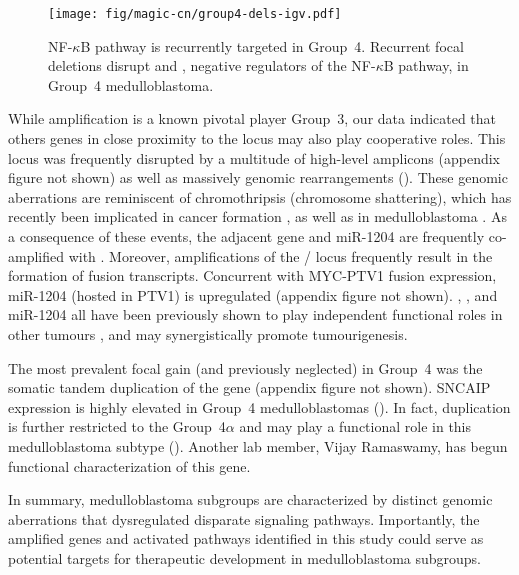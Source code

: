 \begin{SCfigure}[2]
	\centering
	\texttt{[image: fig/magic-cn/group4-dels-igv.pdf]}
	\caption[NF-$\kappa$B pathway is recurrently targeted in Group~4]
	{
	NF-$\kappa$B pathway is recurrently targeted in Group~4.
	Recurrent focal deletions disrupt  and , negative regulators of the NF-$\kappa$B pathway, in Group~4 medulloblastoma.
	}
	\label{fig:group4-dels-igv}
\end{SCfigure}

While  amplification is a known pivotal player Group~3, our data indicated that others genes in close proximity to the  locus may also play cooperative roles. This locus was frequently disrupted by a multitude of high-level amplicons (appendix figure not shown) as well as massively genomic rearrangements (). These genomic aberrations are reminiscent of chromothripsis (chromosome shattering), which has recently been implicated in cancer formation , as well as in medulloblastoma . As a consequence of these events, the adjacent  gene and miR-1204 are frequently co-amplified with . Moreover, amplifications of the / locus frequently result in the formation of fusion transcripts. Concurrent with MYC-PTV1 fusion expression, miR-1204 (hosted in PTV1) is upregulated (appendix figure not shown). , , and miR-1204 all have been previously shown to play independent functional roles in other tumours , and may synergistically promote tumourigenesis.

The most prevalent focal gain (and previously neglected) in Group~4 was the somatic tandem duplication of the  gene (appendix figure not shown). SNCAIP expression is highly elevated in Group~4 medulloblastomas (). In fact,  duplication is further restricted to the Group~4$\alpha$ and may play a functional role in this medulloblastoma subtype (). Another lab member, Vijay Ramaswamy, has begun functional characterization of this gene.

In summary, medulloblastoma subgroups are characterized by distinct genomic aberrations that dysregulated disparate signaling pathways. Importantly, the amplified genes and activated pathways identified in this study could serve as potential targets for therapeutic development in medulloblastoma subgroups.


